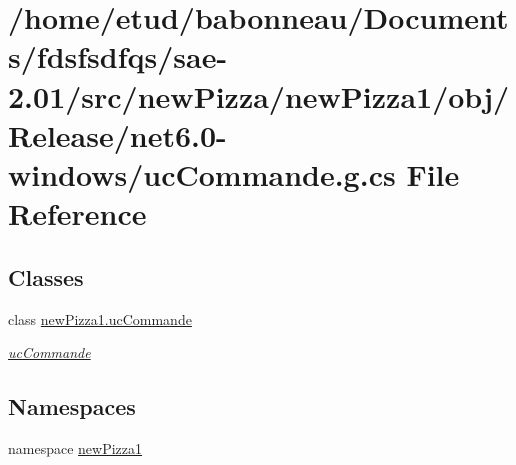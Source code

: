 \hypertarget{Release_2net6_80-windows_2ucCommande_8g_8cs}{}\section{/home/etud/babonneau/\+Documents/fdsfsdfqs/sae-\/2.01/src/new\+Pizza/new\+Pizza1/obj/\+Release/net6.0-\/windows/uc\+Commande.g.\+cs File Reference}
\label{Release_2net6_80-windows_2ucCommande_8g_8cs}
\subsection*{Classes}
\begin{DoxyCompactItemize}
\item 
class \hyperlink{classnewPizza1_1_1ucCommande}{new\+Pizza1.\+uc\+Commande}
\begin{DoxyCompactList}\small\item\em \hyperlink{classnewPizza1_1_1ucCommande}{uc\+Commande} \end{DoxyCompactList}\end{DoxyCompactItemize}
\subsection*{Namespaces}
\begin{DoxyCompactItemize}
\item 
namespace \hyperlink{namespacenewPizza1}{new\+Pizza1}
\end{DoxyCompactItemize}
